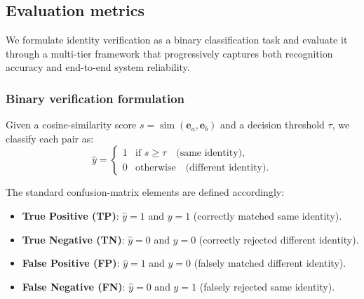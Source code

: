 
\subsection{Evaluation metrics}
\label{subsec:metrics}

We formulate identity verification as a binary classification task
and evaluate it through a multi-tier framework that progressively
captures both recognition accuracy and end-to-end system reliability.

\subsubsection{Binary verification formulation}
\label{subsubsec:binary}

Given a cosine-similarity score $s = \operatorname{sim}(\mathbf{e}_a, \mathbf{e}_b)$
and a decision threshold $\tau$, we classify each pair as:
\begin{equation}
    \hat{y} =
    \begin{cases}
        1 & \text{if } s \geq \tau \quad \text{(same identity)}, \\
        0 & \text{otherwise} \quad \text{(different identity)}.
    \end{cases}
    \label{eq:decision}
\end{equation}

The standard confusion-matrix elements are defined accordingly:
\begin{itemize}
    \item \textbf{True Positive (TP)}: $\hat{y} = 1$ and $y = 1$ (correctly matched same identity).
    \item \textbf{True Negative (TN)}: $\hat{y} = 0$ and $y = 0$ (correctly rejected different identity).
    \item \textbf{False Positive (FP)}: $\hat{y} = 1$ and $y = 0$ (falsely matched different identity).
    \item \textbf{False Negative (FN)}: $\hat{y} = 0$ and $y = 1$ (falsely rejected same identity).
\end{itemize}

